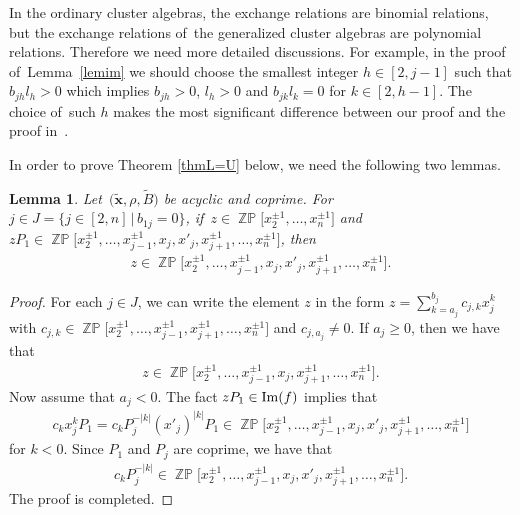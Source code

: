 \documentclass[pdftex]{sigma}
\numberwithin{equation}{section}
\newtheorem{Lemma}[Theorem]{Lemma}
\begin{document}
\begin{Remark}In the ordinary cluster algebras, the exchange relations are binomial relations, but the exchange relations of~the generalized cluster algebras are polynomial relations. Therefore we need more detailed discussions. For example, in the proof of~Lemma~\ref{lemim} we should choose the smallest integer $h\in[2,j-1]$ such that $b_{jh}l_h>0$ which implies $b_{jh}>0$, $l_h>0$ and $b_{jk}l_k=0$ for $k\in[2,h-1]$. The choice of~such $h$ makes the most significant difference between our proof and the proof in~\cite{bfz}.
\end{Remark}

In order to prove Theorem \ref{thmL=U} below, we need the following two lemmas.
\begin{Lemma}\label{lemzp}
Let~$\big(\widetilde{\mathbf{x}},\rho,\widetilde{B}\big)$ be acyclic and coprime.
For $j\in J=\{j\in[2,n]\,|\, b_{1j}=0\}$, if~$z\in \mathop{\mathbb{ZP}}\!\big[x^{\pm1}_2,\ldots,x^{\pm1}_n\big]$ and $zP_1\in\mathop{\mathbb{ZP}}\!\big[x^{\pm1}_{2},\ldots,x^{\pm1}_{j-1},x_j,x'_j,
x^{\pm1}_{j+1},\ldots,x^{\pm1}_{n}\big]$,
then
\begin{gather*}
z\in\mathop{\mathbb{ZP}}
\big[x^{\pm1}_{2},\ldots,x^{\pm1}_{j-1},x_j,x'_j,x^{\pm1}_{j+1},\ldots,x^{\pm1}_{n}\big].
\end{gather*}
\end{Lemma}
\begin{proof}
For each $j\in J$, we can write the element $z$ in the form $z=\sum\limits_{k=a_j}^{b_j}c_{j,k}x^{k}_j$ with $c_{j,k}\in \mathop{\mathbb{ZP}}\!\big[x^{\pm1}_{2},\ldots,x^{\pm1}_{j-1},x^{\pm1}_{j+1},\ldots,x^{\pm1}_{n}\big]$ and $c_{j,a_j}\neq0$.
If $a_j\geq0$, then we have that
\begin{gather*}
z\in \mathop{\mathbb{ZP}}\!\big[x^{\pm1}_{2},\ldots, x^{\pm1}_{j-1},x_j,x^{\pm1}_{j+1},\ldots,x^{\pm1}_{n}\big].
\end{gather*}
Now assume that $a_j<0$. The fact $zP_1\in\mathop{\rm Im}(f)$ implies that
\begin{gather*}
c_kx_{j}^{k}P_1= c_kP^{-|k|}_j(x'_j)^{|k|}P_1\in \mathop{\mathbb{ZP}}\!\big[x^{\pm1}_{2},\ldots,x^{\pm1}_{j-1},x_j,x'_j,x^{\pm1}_{j+1},\ldots,x^{\pm1}_{n}\big]
\end{gather*}
for $k<0$. Since $P_1$ and $P_j$ are coprime, we have that
\begin{gather*}
c_kP^{-|k|}_j\in \mathop{\mathbb{ZP}}\!\big[x^{\pm1}_{2},\ldots,x^{\pm1}_{j-1},x_j,x'_j,x^{\pm1}_{j+1},\ldots,x^{\pm1}_{n}\big].
\end{gather*}
The proof is completed.
\end{proof}
\end{document}
